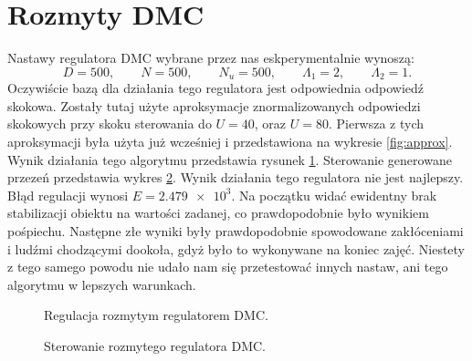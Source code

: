 \section{Rozmyty DMC}
Nastawy regulatora DMC wybrane przez nas eskperymentalnie wynoszą:
\begin{equation}
  D = 500, \qquad N = 500, \qquad N_u = 500, \qquad \Lambda_1 = 2, \qquad \Lambda_2 = 1.
\end{equation}
Oczywiście bazą dla działania tego regulatora jest odpowiednia odpowiedź skokowa.
Zostały tutaj użyte aproksymacje znormalizowanych odpowiedzi skokowych przy skoku
sterowania do $U = 40$, oraz $U = 80$. Pierwsza z tych aproksymacji była użyta już
wcześniej i przedstawiona na wykresie \ref{fig:approx}. Wynik działania tego
algorytmu przedstawia rysunek \ref{fig:z6_dmc}. Sterowanie generowane przezeń przedstawia
wykres \ref{fig:z6_dmc_u}. Wynik działania tego regulatora nie jest najlepszy. Błąd regulacji wynosi $E=\num{2.479e+3}$.
Na początku widać ewidentny brak stabilizacji obiektu na wartości zadanej, co
prawdopodobnie było wynikiem pośpiechu. Następne złe wyniki były prawdopodobnie
spowodowane zakłóceniami i ludźmi chodzącymi dookoła, gdyż było to wykonywane
na koniec zajęć. Niestety z tego samego powodu nie udało nam się przetestować
innych nastaw, ani tego algorytmu w lepszych warunkach.


\begin{figure}[tb]
\centering
{}
\caption{Regulacja rozmytym regulatorem DMC.}
\label{fig:z6_dmc}
\end{figure}

\begin{figure}[tb]
\centering
{}
\caption{Sterowanie rozmytego regulatora DMC.}
\label{fig:z6_dmc_u}
\end{figure}
